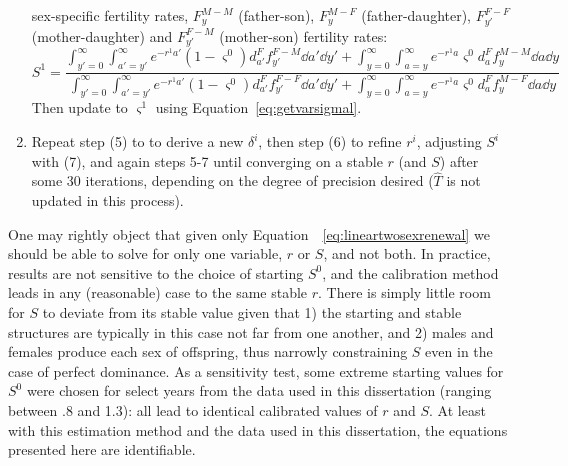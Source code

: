 \begin{enumerate}
  sex-specific fertility rates, $F_y^{M-M}$ (father-son), $F_y^{M-F}$
  (father-daughter), $F_{y'}^{F-F}$ (mother-daughter) and $F_{y'}^{F-M}$
  (mother-son) fertility rates:
  \begin{equation}
  S^1 = \frac{ \int _{y'=0}^\infty \int _{a'=y'}^\infty e^{-r^1a'}
                      (1-\varsigma^0)d_{a'}^F f_{y'}^{F-M} \dd a' \dd y' + \int
                      _{y=0}^\infty \int _{a=y}^\infty e^{-r^1a}
                      \varsigma^0 d_{a}^F f_{y}^{M-M} \dd a \dd y}{\int
                      _{y'=0}^\infty \int _{a'=y'}^\infty e^{-r^1a'}
                      (1-\varsigma^0)d_{a'}^F f_{y'}^{F-F} \dd a' \dd y' + \int
                      _{y=0}^\infty \int _{a=y}^\infty e^{-r^1a} \varsigma^0
                      d_{a}^F f_{y}^{M-F} \dd a \dd y}
  \end{equation}
  Then update to $\varsigma^1$ using Equation~\eqref{eq:getvarsigmal}.
  \item Repeat step (5) to to derive a new $\delta^i$, then step (6) to refine
  $r^i$, adjusting $S^i$ with (7), and again steps 5-7 until converging on a
  stable $r$ (and $S$) after some 30 iterations, depending on the degree of
  precision desired ($\widehat{T}$ is not updated in this process).
\end{enumerate}
  One may rightly object that given only
  Equation~~\eqref{eq:lineartwosexrenewal} we should be able to
  solve for only one variable, $r$ or $S$, and not both. In practice, results
  are not sensitive to the choice of starting $S^0$, and the
  calibration method leads in any (reasonable) case to the same stable $r$.
  There is simply little room for $S$ to deviate from its stable value given
  that 1) the starting and stable structures are typically in this
  case not far from one another, and 2) males and females produce each sex of
  offspring, thus narrowly constraining $S$ even in the case of
  perfect dominance. As a
  sensitivity test, some extreme starting values for $S^0$ were chosen for
  select years from the data used in this dissertation (ranging between .8 and
  1.3): all lead to identical calibrated values of $r$ and $S$. At least with
  this estimation method and the data used in this dissertation, the equations
  presented here are identifiable.
